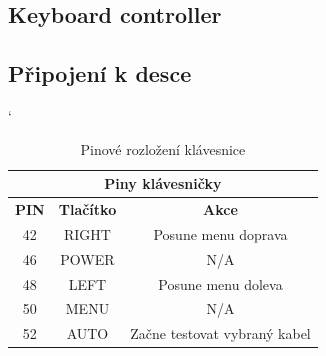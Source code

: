 \subsection{Keyboard controller}


\subsection{Připojení k desce}
\begin{table} [h!]
	\centering
	\catcode` %
	\begin{tabular}[c]{|| c | c | c ||}
	\hline
		\multicolumn{3}{||c||}{Piny klávesničky} \\
	\hline
 		 \textbf{PIN} & \textbf{Tlačítko} & \textbf{Akce}\\
	\hline
		42 &  RIGHT & Posune menu doprava\\
	\hline
		46 & POWER & N/A\\
	\hline
		48 & LEFT & Posune menu doleva\\
	\hline
		50 & MENU & N/A\\
	\hline
		52 & AUTO & Začne testovat vybraný kabel\\
	\hline
	\end{tabular}
	\caption{Pinové rozložení klávesnice}
	\label{table:pinKB}
\end{table}